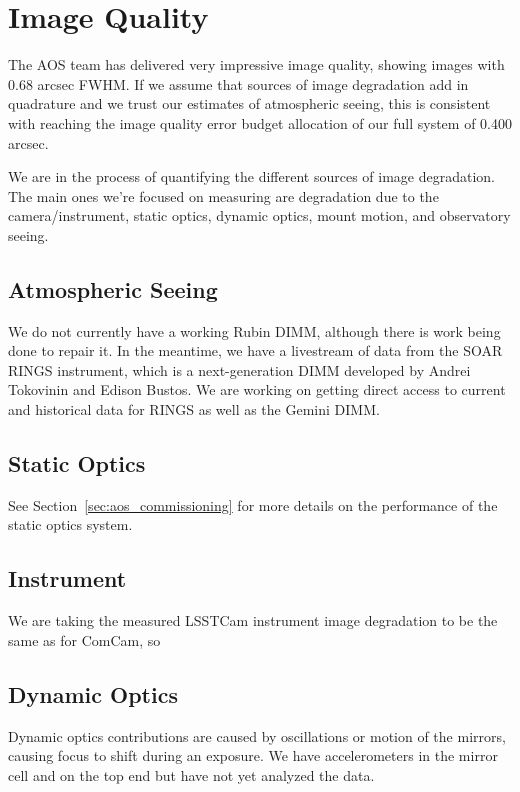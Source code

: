 \section{Image Quality}
\label{sec:image_quality}

The AOS team has delivered very impressive image quality, showing images with 0.68 arcsec FWHM. If we assume that sources of image degradation add in quadrature and we trust our estimates of atmospheric seeing, this is consistent with reaching the image quality error budget allocation of our full system of 0.400 arcsec.

We are in the process of quantifying the different sources of image degradation. The main ones we're focused on measuring are degradation due to the camera/instrument, static optics, dynamic optics, mount motion, and observatory seeing.

\subsection{Atmospheric Seeing}

We do not currently have a working Rubin DIMM, although there is work being done to repair it. In the meantime, we have a livestream of data from the SOAR RINGS instrument, which is a  next-generation DIMM developed by Andrei Tokovinin and Edison Bustos. We are working on getting direct access to current and historical data for RINGS as well as the Gemini DIMM.

\subsection{Static Optics}

See Section~\ref{sec:aos_commissioning} for more details on the performance of the static optics system.

\subsection{Instrument}

We are taking the measured LSSTCam instrument image degradation to be the same as for ComCam, so 

\subsection{Dynamic Optics}

Dynamic optics contributions are caused by oscillations or motion of the mirrors, causing focus to shift during an exposure. We have accelerometers in the mirror cell and on the top end but have not yet analyzed the data.

